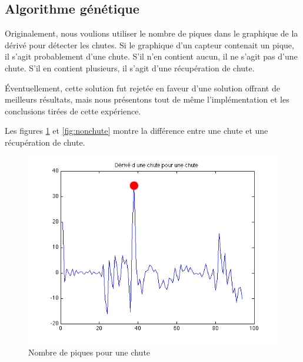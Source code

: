 \documentclass[12pt,letterpaper]{article}
\begin{document}
\subsection{Algorithme génétique}

Originalement, nous voulions utiliser le nombre de piques dans le graphique de la dérivé pour détecter les chutes.
Si le graphique d'un capteur contenait un pique, il s'agit probablement d'une chute. S'il n'en contient aucun, il
ne s'agit pas d'une chute. S’il en contient plusieurs, il s'agit d'une récupération de chute.

Éventuellement, cette solution fut rejetée en faveur d'une solution offrant de meilleurs résultats, mais nous
présentons tout de même l'implémentation et les conclusions tirées de cette expérience.

Les figures \ref{fig:chute} et \ref{fig:nonchute} montre la différence entre une chute et une récupération de chute.

\begin{figure}[htp]
\centering
\includegraphics[scale=0.5]{images/piques_chute.png}
\caption{Nombre de piques pour une chute}
\label{fig:chute}
\end{figure}
\end{document}
